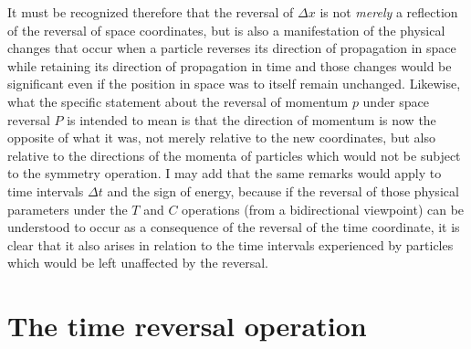 \documentclass[notitlepage,12pt]{report}
\begin{document}
It must be recognized therefore that the reversal of $\Delta x$ is not \textit{merely} a reflection of the reversal of space coordinates, but is also a manifestation of the physical changes that occur when a particle reverses its direction of propagation in space while retaining its direction of propagation in time and those changes would be significant even if the position in space was to itself remain unchanged. Likewise, what the specific statement about the reversal of momentum $p$ under space reversal $P$ is intended to mean is that the direction of momentum is now the opposite of what it was, not merely relative to the new coordinates, but also relative to the directions of the momenta of particles which would not be subject to the symmetry operation. I may add that the same remarks would apply to time intervals $\Delta t$ and the sign of energy, because if the reversal of those physical parameters under the $T$ and $C$ operations (from a bidirectional viewpoint) can be understood to occur as a consequence of the reversal of the time coordinate, it is clear that it also arises in relation to the time intervals experienced by particles which would be left unaffected by the reversal.

\section{The time reversal operation}
\end{document}
